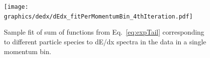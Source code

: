 %
%
\begin{figure}[ht!]%
\centering%
\texttt{[image: graphics/dedx/dEdx\_fitPerMomentumBin\_4thIteration.pdf]}\vspace{-5pt}%
\caption[Sample fit to dE/dx spectrum in the data in single momentum bin.]%
{Sample fit of sum of functions from Eq.~\eqref{eq:expTail} corresponding to different particle species to dE/dx spectra in the data in a single momentum bin.}\label{fig:dEdxFit}\vspace{10pt}
\end{figure}
%
%
\begin{figure}[hb!]\vspace{-45pt}
\centering
\parbox{0.4725\textwidth}{
  \centering
  \begin{subfigure}[b]{\linewidth}{
                }
  \end{subfigure}\\[-3pt]
  \begin{subfigure}[b]{\linewidth}

\end{subfigure}}
\end{figure}
